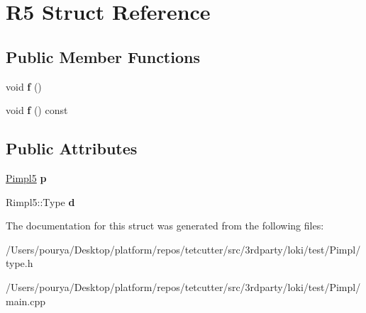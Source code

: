 \hypertarget{structR5}{}\section{R5 Struct Reference}
\label{structR5}
\subsection*{Public Member Functions}
\begin{DoxyCompactItemize}
\item 
\hypertarget{structR5_ab7caf0d23fefe7c302c3722d27395200}{}void {\bfseries f} ()\label{structR5_ab7caf0d23fefe7c302c3722d27395200}

\item 
\hypertarget{structR5_af7448e790e85a6d8743abe132b009fd7}{}void {\bfseries f} () const \label{structR5_af7448e790e85a6d8743abe132b009fd7}

\end{DoxyCompactItemize}
\subsection*{Public Attributes}
\begin{DoxyCompactItemize}
\item 
\hypertarget{structR5_a450d60456d75c44172735ad40a117805}{}\hyperlink{classLoki_1_1Pimpl}{Pimpl5} {\bfseries p}\label{structR5_a450d60456d75c44172735ad40a117805}

\item 
\hypertarget{structR5_a562d32c962d664764c73ff958ac01087}{}Rimpl5\+::\+Type {\bfseries d}\label{structR5_a562d32c962d664764c73ff958ac01087}

\end{DoxyCompactItemize}


The documentation for this struct was generated from the following files\+:\begin{DoxyCompactItemize}
\item 
/\+Users/pourya/\+Desktop/platform/repos/tetcutter/src/3rdparty/loki/test/\+Pimpl/type.\+h\item 
/\+Users/pourya/\+Desktop/platform/repos/tetcutter/src/3rdparty/loki/test/\+Pimpl/main.\+cpp\end{DoxyCompactItemize}
